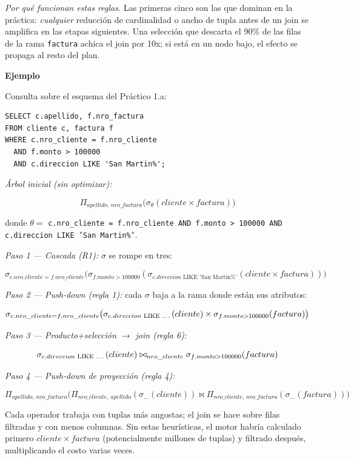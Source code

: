 \documentclass[11pt,a4paper]{article}
\newcommand{\itemcabecera}[1]{\noindent\textbf{#1}\par\medskip}
\newcommand{\bloqueEjemplo}{\itemcabecera{Ejemplo}}
\begin{document}
\textit{Por qué funcionan estas reglas.} Las primeras cinco son las que dominan en la práctica: \emph{cualquier} reducción de cardinalidad o ancho de tupla antes de un join se amplifica en las etapas siguientes. Una selección que descarta el 90\% de las filas de la rama \texttt{factura} achica el join por 10x; si está en un nodo bajo, el efecto se propaga al resto del plan.

\bloqueEjemplo

Consulta sobre el esquema del Práctico 1.a:

\begin{lstlisting}
SELECT c.apellido, f.nro_factura
FROM cliente c, factura f
WHERE c.nro_cliente = f.nro_cliente
  AND f.monto > 100000
  AND c.direccion LIKE 'San Martin%';
\end{lstlisting}

\textit{Árbol inicial (sin optimizar):}

\[
\Pi_{apellido,\,nro\_factura}\big(\sigma_\theta(cliente \times factura)\big)
\]

donde $\theta = $ \texttt{c.nro\_cliente = f.nro\_cliente AND f.monto > 100000 AND c.direccion LIKE 'San Martin\%'}.

\textit{Paso 1 --- Cascada (R1):} $\sigma$ se rompe en tres:

\[
\sigma_{c.nro\_cliente=f.nro\_cliente}\big(\sigma_{f.monto>100000}(\sigma_{c.direccion\text{ LIKE 'San Martin\%'}}(cliente \times factura))\big)
\]

\textit{Paso 2 --- Push-down (regla 1):} cada $\sigma$ baja a la rama donde están sus atributos:

\[
\sigma_{c.nro\_cliente=f.nro\_cliente}\big(\sigma_{c.direccion \text{ LIKE \dots}}(cliente) \times \sigma_{f.monto>100000}(factura)\big)
\]

\textit{Paso 3 --- Producto+selección $\to$ join (regla 6):}

\[
\sigma_{c.direccion\text{ LIKE \dots}}(cliente) \bowtie_{nro\_cliente} \sigma_{f.monto>100000}(factura)
\]

\textit{Paso 4 --- Push-down de proyección (regla 4):}

\[
\Pi_{apellido,\,nro\_factura}\big(\Pi_{nro\_cliente,\,apellido}(\sigma_{\ldots}(cliente)) \bowtie \Pi_{nro\_cliente,\,nro\_factura}(\sigma_{\ldots}(factura))\big)
\]

Cada operador trabaja con tuplas más angostas; el join se hace sobre filas filtradas y con menos columnas. Sin estas heurísticas, el motor habría calculado primero $cliente \times factura$ (potencialmente millones de tuplas) y filtrado después, multiplicando el costo varias veces.
\end{document}
